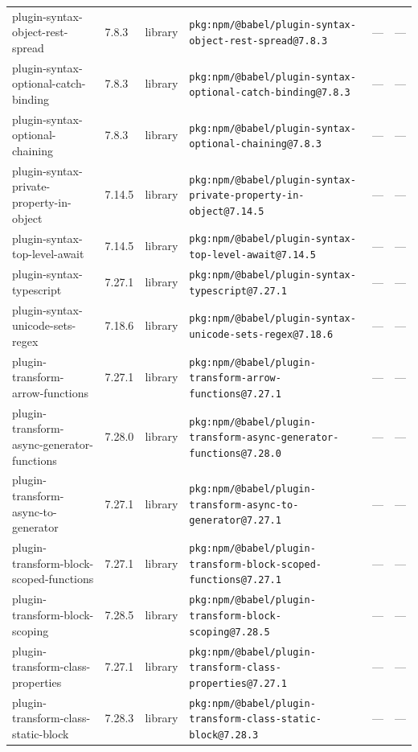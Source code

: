 \documentclass[11pt,a4paper]{article}
\begin{document}
\begin{longtable}{|p{4cm}|p{2cm}|p{1.6cm}|p{5cm}|p{1.5cm}|p{3.5cm}|}
\raggedright plugin-syntax-object-rest-spread & 7.8.3 & library & \small\texttt{pkg:npm/@babel/plugin-syntax-object-rest-spread@7.8.3} & — & \small — \\
\raggedright plugin-syntax-optional-catch-binding & 7.8.3 & library & \small\texttt{pkg:npm/@babel/plugin-syntax-optional-catch-binding@7.8.3} & — & \small — \\
\raggedright plugin-syntax-optional-chaining & 7.8.3 & library & \small\texttt{pkg:npm/@babel/plugin-syntax-optional-chaining@7.8.3} & — & \small — \\
\raggedright plugin-syntax-private-property-in-object & 7.14.5 & library & \small\texttt{pkg:npm/@babel/plugin-syntax-private-property-in-object@7.14.5} & — & \small — \\
\raggedright plugin-syntax-top-level-await & 7.14.5 & library & \small\texttt{pkg:npm/@babel/plugin-syntax-top-level-await@7.14.5} & — & \small — \\
\raggedright plugin-syntax-typescript & 7.27.1 & library & \small\texttt{pkg:npm/@babel/plugin-syntax-typescript@7.27.1} & — & \small — \\
\raggedright plugin-syntax-unicode-sets-regex & 7.18.6 & library & \small\texttt{pkg:npm/@babel/plugin-syntax-unicode-sets-regex@7.18.6} & — & \small — \\
\raggedright plugin-transform-arrow-functions & 7.27.1 & library & \small\texttt{pkg:npm/@babel/plugin-transform-arrow-functions@7.27.1} & — & \small — \\
\raggedright plugin-transform-async-generator-functions & 7.28.0 & library & \small\texttt{pkg:npm/@babel/plugin-transform-async-generator-functions@7.28.0} & — & \small — \\
\raggedright plugin-transform-async-to-generator & 7.27.1 & library & \small\texttt{pkg:npm/@babel/plugin-transform-async-to-generator@7.27.1} & — & \small — \\
\raggedright plugin-transform-block-scoped-functions & 7.27.1 & library & \small\texttt{pkg:npm/@babel/plugin-transform-block-scoped-functions@7.27.1} & — & \small — \\
\raggedright plugin-transform-block-scoping & 7.28.5 & library & \small\texttt{pkg:npm/@babel/plugin-transform-block-scoping@7.28.5} & — & \small — \\
\raggedright plugin-transform-class-properties & 7.27.1 & library & \small\texttt{pkg:npm/@babel/plugin-transform-class-properties@7.27.1} & — & \small — \\
\raggedright plugin-transform-class-static-block & 7.28.3 & library & \small\texttt{pkg:npm/@babel/plugin-transform-class-static-block@7.28.3} & — & \small — \\

\end{longtable}
\end{document}

